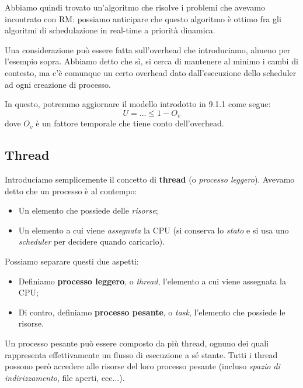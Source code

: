 \documentclass[a4paper,11pt]{article}
\begin{document}
\par\smallskip

Abbiamo quindi trovato un'algoritmo che risolve i problemi che avevamo incontrato con RM: possiamo anticipare che questo algoritmo è ottimo fra gli algoritmi di schedulazione in real-time a priorità dinamica.

Una considerazione può essere fatta sull'overhead che introduciamo, almeno per l'esempio sopra. Abbiamo detto che sì, si cerca di mantenere al minimo i cambi di contesto, ma c'è comunque un certo overhead dato dall'esecuzione dello scheduler ad ogni creazione di processo.

In questo, potremmo aggiornare il modello introdotto in 9.1.1 come segue:
$$
U = ... \leq 1 - O_v 
$$
dove $O_v$ è un fattore temporale che tiene conto dell'overhead.

\subsection{Thread}
Introduciamo semplicemente il concetto di \textbf{thread} (o \textit{processo leggero}).
Avevamo detto che un processo è al contempo:
\begin{itemize}
	\item Un elemento che possiede delle \textit{risorse};
	\item Un elemento a cui viene \textit{assegnata} la CPU (si conserva lo \textit{stato} e si usa uno \textit{scheduler} per decidere quando caricarlo).
\end{itemize}

Possiamo separare questi due aspetti:
\begin{itemize}
	\item Definiamo \textbf{processo leggero}, o \textit{thread}, l'elemento a cui viene assegnata la CPU;
	\item Di contro, definiamo \textbf{processo pesante}, o \textit{task}, l'elemento che possiede le risorse.
\end{itemize}

Un processo pesante può essere composto da più thread, ognuno dei quali rappresenta effettivamente un flusso di esecuzione a sé stante. Tutti i thread possono però accedere alle risorse del loro processo pesante (incluso \textit{spazio di indirizzamento}, file aperti, ecc...). 
\end{document}
